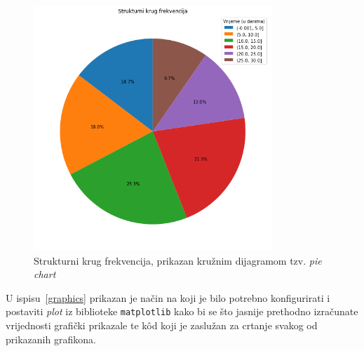 \begin{figure}[H]
\centering
\includegraphics[width=0.8\textwidth]{assets/strukturni_krug_frekvencija.png}
\caption{Strukturni krug frekvencija, prikazan kružnim dijagramom tzv. \textit{pie chart}}
\end{figure}

\newpage

U ispisu~\ref{graphics} prikazan je način na koji je bilo potrebno konfigurirati i postaviti \textit{plot} iz biblioteke \texttt{matplotlib} kako bi se što jasnije prethodno izračunate vrijednosti grafički prikazale te k\^od koji je zaslužan za crtanje svakog od prikazanih grafikona.


